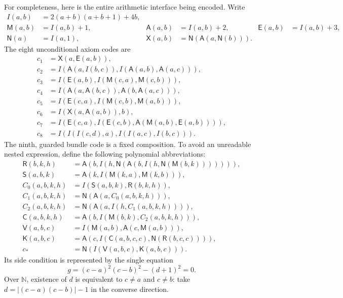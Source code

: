 \documentclass[11pt,letterpaper]{article}
\theoremstyle{definition}\newtheorem{definition}[theorem]{Definition}
\theoremstyle{remark}\newtheorem{remark}[theorem]{Remark}
\newcommand{\N}{\mathbb N}
\begin{document}
For completeness, here is the entire arithmetic interface being encoded.
Write
\begin{align*}
 I(a,b)&=2(a+b)(a+b+1)+4b,\\
 \mathsf M(a,b)&=I(a,b)+1,&
 \mathsf A(a,b)&=I(a,b)+2,&
 \mathsf E(a,b)&=I(a,b)+3,\\
 \mathsf N(a)&=I(a,1),&
 \mathsf X(a,b)&=\mathsf N(\mathsf A(a,\mathsf N(b))).
\end{align*}
The eight unconditional axiom codes are
\begin{align*}
 c_1&=\mathsf X(a,\mathsf E(a,b)),\\
 c_2&=I(\mathsf A(a,I(b,c)),I(\mathsf A(a,b),\mathsf A(a,c))),\\
 c_3&=I(\mathsf E(a,b),I(\mathsf M(c,a),\mathsf M(c,b))),\\
 c_4&=I(\mathsf A(a,\mathsf A(b,c)),\mathsf A(b,\mathsf A(a,c))),\\
 c_5&=I(\mathsf E(c,a),I(\mathsf M(c,b),\mathsf M(a,b))),\\
 c_6&=I(\mathsf X(a,\mathsf A(a,b)),b),\\
 c_7&=I(\mathsf E(c,a),I(\mathsf E(c,b),\mathsf A(\mathsf M(a,b),\mathsf E(a,b)))),\\
 c_8&=I(I(I(c,d),a),I(I(a,c),I(b,c))).
\end{align*}
The ninth, guarded bundle code is a fixed composition. To avoid an
unreadable nested expression, define the following polynomial abbreviations:
\begin{align*}
 \mathsf R(b,k,h)&=\mathsf A(b,I(h,\mathsf N(\mathsf A(b,I(h,\mathsf N(\mathsf M(b,k))))))),\\
 \mathsf S(a,b,k)&=\mathsf A(k,I(\mathsf M(k,a),\mathsf M(k,b))),\\
 C_0(a,b,k,h)&=I(\mathsf S(a,b,k),\mathsf R(b,k,h)),\\
 C_1(a,b,k,h)&=\mathsf N(\mathsf A(a,C_0(a,b,k,h))),\\
 C_2(a,b,k,h)&=\mathsf N(\mathsf A(a,I(h,C_1(a,b,k,h)))),\\
 \mathsf C(a,b,k,h)&=\mathsf A(b,I(\mathsf M(b,k),C_2(a,b,k,h))),\\
 \mathsf V(a,b,c)&=I(\mathsf M(a,b),\mathsf A(c,\mathsf M(a,b))),\\
 \mathsf K(a,b,c)&=\mathsf A(c,I(\mathsf C(a,b,c,c),\mathsf N(\mathsf R(b,c,c)))),\\
 c_*&=\mathsf N(I(\mathsf V(a,b,c),\mathsf K(a,b,c))).
\end{align*}
Its side condition is represented by the single equation
\[
 g=(c-a)^2(c-b)^2-(d+1)^2=0.
\]
Over $\N$, existence of $d$ is equivalent to $c\ne a$ and $c\ne b$:
take $d=|(c-a)(c-b)|-1$ in the converse direction.
\end{document}
